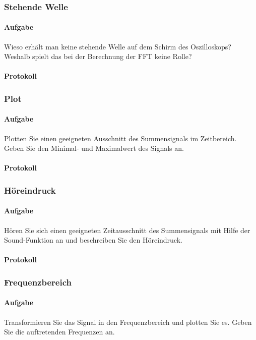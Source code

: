 \documentclass[10pt]{report}
\begin{document}
        \subsubsection{Stehende Welle}
        \paragraph{Aufgabe}
        Wieso erhält man keine stehende Welle auf dem Schirm des Oszilloskops? Weshalb
        spielt das bei der Berechnung der FFT keine Rolle?
        \paragraph{Protokoll}


        \subsubsection{Plot}
        \paragraph{Aufgabe}
        Plotten Sie einen geeigneten Ausschnitt des Summensignals im Zeitbereich. Geben
        Sie den Minimal- und Maximalwert des Signals an.
        \paragraph{Protokoll}

        \subsubsection{Höreindruck}
        \paragraph{Aufgabe}
        Hören Sie sich einen geeigneten Zeitausschnitt des Summensignals mit Hilfe der
        \glqq{}Sound\grqq{}-Funktion an und beschreiben Sie den Höreindruck.
        \paragraph{Protokoll}

        \subsubsection{Frequenzbereich}
        \paragraph{Aufgabe}
        Transformieren Sie das Signal in den Frequenzbereich und plotten Sie es. Geben Sie
        die auftretenden Frequenzen an.
\end{document}
